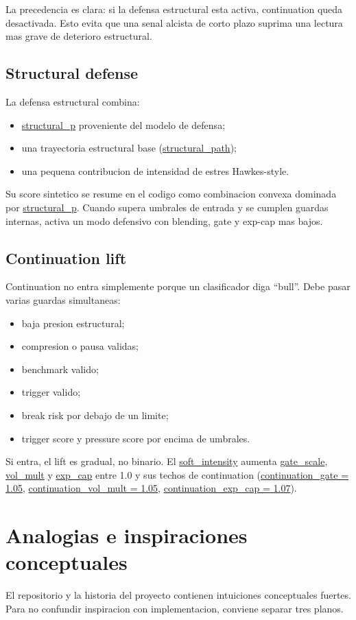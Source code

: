 \documentclass[11pt,letterpaper]{article}
\newcommand{\code}[1]{{\urlstyle{tt}\url{#1}}}
\begin{document}
La precedencia es clara: si la defensa estructural esta activa, continuation queda desactivada. Esto evita que una senal alcista de corto plazo suprima una lectura mas grave de deterioro estructural.

\subsection{Structural defense}
La defensa estructural combina:
\begin{itemize}
    \item \code{structural\_p} proveniente del modelo de defensa;
    \item una trayectoria estructural base (\code{structural\_path});
    \item una pequena contribucion de intensidad de estres Hawkes-style.
\end{itemize}

Su score sintetico se resume en el codigo como combinacion convexa dominada por \code{structural\_p}. Cuando supera umbrales de entrada y se cumplen guardas internas, activa un modo defensivo con blending, gate y exp-cap mas bajos.

\subsection{Continuation lift}
Continuation no entra simplemente porque un clasificador diga \enquote{bull}. Debe pasar varias guardas simultaneas:
\begin{itemize}
    \item baja presion estructural;
    \item compresion o pausa validas;
    \item benchmark valido;
    \item trigger valido;
    \item break risk por debajo de un limite;
    \item trigger score y pressure score por encima de umbrales.
\end{itemize}

Si entra, el lift es gradual, no binario. El \code{soft\_intensity} aumenta \code{gate\_scale}, \code{vol\_mult} y \code{exp\_cap} entre 1.0 y sus techos de continuation (\code{continuation\_gate = 1.05}, \code{continuation\_vol\_mult = 1.05}, \code{continuation\_exp\_cap = 1.07}).

\section{Analogias e inspiraciones conceptuales}
El repositorio y la historia del proyecto contienen intuiciones conceptuales fuertes. Para no confundir inspiracion con implementacion, conviene separar tres planos.
\end{document}
